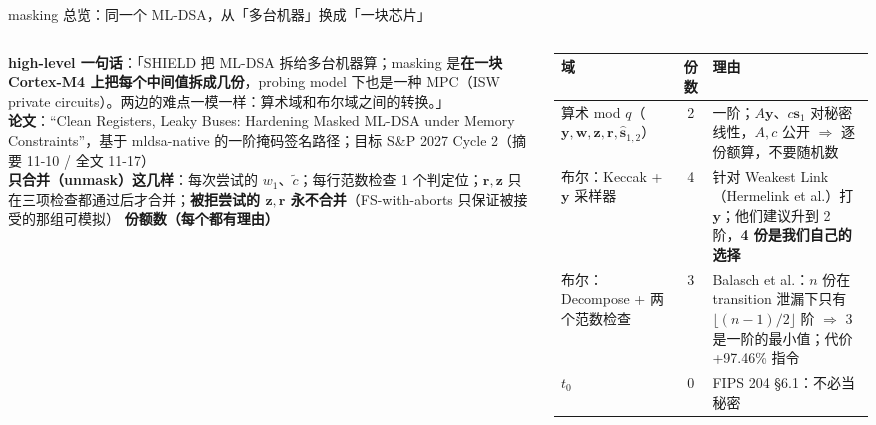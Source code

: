 \documentclass[aspectratio=169,10pt,fontset=none]{ctexbeamer}
\begin{document}
\begin{frame}{masking 总览：同一个 ML-DSA，从「多台机器」换成「一块芯片」}
\begin{columns}[T]
\textbf{high-level 一句话}：「SHIELD 把 ML-DSA 拆给多台机器算；masking 是\textbf{在一块 Cortex-M4 上把每个中间值拆成几份}，probing model 下也是一种 MPC（ISW private circuits）。两边的难点一模一样：\alert{算术域和布尔域之间的转换}。」\\[3pt]
\textbf{论文}：``Clean Registers, Leaky Buses: Hardening Masked ML-DSA under Memory Constraints''，基于 mldsa-native 的一阶掩码签名路径；目标 S\&P 2027 Cycle 2（摘要 11-10 / 全文 11-17）\\[3pt]
\textbf{只合并（unmask）这几样}：每次尝试的 $w_1$、$\tilde c$；每行范数检查 1 个判定位；$\mathbf r,\mathbf z$ 只在三项检查都通过后才合并；\textbf{被拒尝试的 $\mathbf z,\mathbf r$ 永不合并}（FS-with-aborts 只保证被接受的那组可模拟）
\textbf{份额数（每个都有理由）}\\[2pt]
{\scriptsize\renewcommand{\arraystretch}{1.15}
\begin{tabularx}{\linewidth}{@{}p{2.3cm}cY@{}}\toprule
域 & 份数 & 理由 \\\midrule
算术 mod $q$（$\mathbf y,\mathbf w,\mathbf z,\mathbf r,\hat{\mathbf s}_{1,2}$）& 2 & 一阶；$A\mathbf y$、$c\mathbf s_1$ 对秘密线性，$A,c$ 公开 $\Rightarrow$ 逐份额算，不要随机数 \\
布尔：Keccak + $\mathbf y$ 采样器 & 4 & 针对 Weakest Link（Hermelink et al.）打 $\mathbf y$；他们建议升到 2 阶，\textbf{4 份是我们自己的选择} \\
布尔：Decompose + 两个范数检查 & 3 & Balasch et al.：$n$ 份在 transition 泄漏下只有 $\lfloor(n-1)/2\rfloor$ 阶 $\Rightarrow$ 3 是一阶的最小值；代价 +97.46\% 指令 \\
$t_0$ & 0 & FIPS 204 §6.1：不必当秘密 \\\bottomrule
\end{tabularx}}
\end{columns}
\end{frame}
\end{document}
